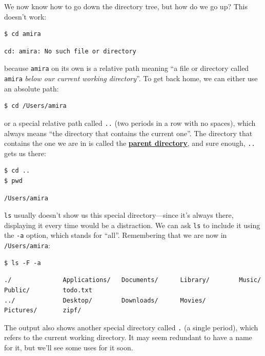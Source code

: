 \documentclass[
]{krantz}
\newcommand{\gref}[2]{\hyperlink{#2}{\textbf{#1}}}
\begin{document}
We now know how to go down the directory tree,
but how do we go up?
This doesn't work:

\begin{verbatim}
$ cd amira
\end{verbatim}

\begin{verbatim}
cd: amira: No such file or directory
\end{verbatim}

because \texttt{amira} on its own is a relative path meaning
``a file or directory called \texttt{amira} \emph{below our current working directory}''.
To get back home,
we can either use an absolute path:

\begin{verbatim}
$ cd /Users/amira
\end{verbatim}

or a special relative path called \texttt{..} (two periods in a row with no spaces),
which always means ``the directory that contains the current one''.
The directory that contains the one we are in is called the \gref{parent directory}{parent\_directory},
and sure enough,
\texttt{..} gets us there:

\begin{verbatim}
$ cd ..
$ pwd
\end{verbatim}

\begin{verbatim}
/Users/amira
\end{verbatim}

\texttt{ls} usually doesn't show us this special directory---since it's always there,
displaying it every time would be a distraction.
We can ask \texttt{ls} to include it using the \texttt{-a} option,
which stands for ``all''.
Remembering that we are now in \texttt{/Users/amira}:

\begin{verbatim}
$ ls -F -a
\end{verbatim}

\begin{verbatim}
./              Applications/   Documents/      Library/        Music/          Public/         todo.txt
../             Desktop/        Downloads/      Movies/         Pictures/       zipf/
\end{verbatim}

The output also shows another special directory called \texttt{.} (a single period),
which refers to the current working directory.
It may seem redundant to have a name for it,
but we'll see some uses for it soon.
\end{document}
